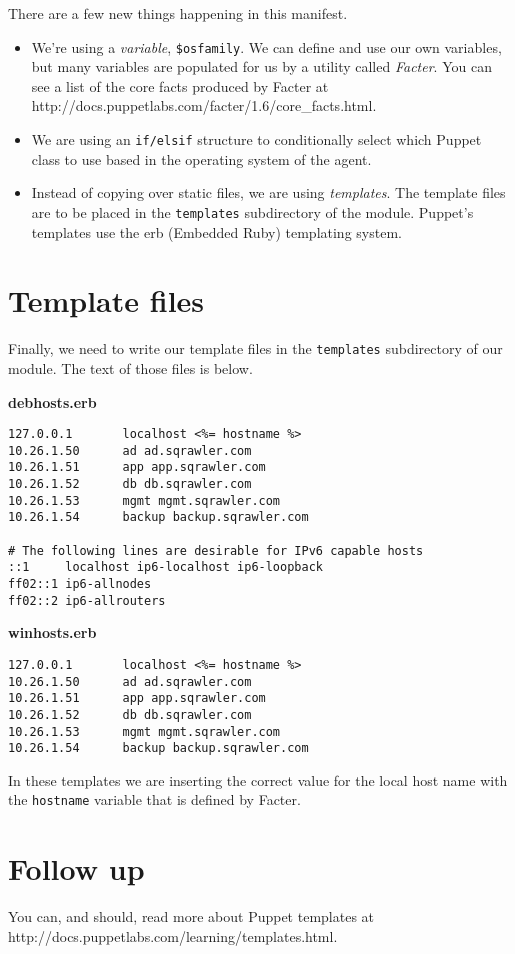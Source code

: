 \documentclass{article}   	%
\begin{document}
\newpage

There are a few new things happening in this manifest.
\begin{itemize}
  \item We're using a \emph{variable}, \texttt{\$osfamily}.  We can define and use our own variables, but many variables are populated for us by a utility called \emph{Facter}.  You can see a list of the core facts produced by Facter at \\ http://docs.puppetlabs.com/facter/1.6/core\_facts.html.
  \item We are using an \texttt{if/elsif} structure to conditionally select which Puppet class to use based in the operating system of the agent.
  \item Instead of copying over static files, we are using \emph{templates}.  The template files are to be placed in the \texttt{templates} subdirectory of the module.  Puppet's templates use the erb (Embedded Ruby) templating system.
\end{itemize}

\section{Template files}
Finally, we need to write our template files in the \texttt{templates} subdirectory of our module.  The text of those files is below.

\textbf{debhosts.erb}
\begin{verbatim}
127.0.0.1       localhost <%= hostname %>
10.26.1.50      ad ad.sqrawler.com
10.26.1.51      app app.sqrawler.com
10.26.1.52      db db.sqrawler.com
10.26.1.53      mgmt mgmt.sqrawler.com
10.26.1.54      backup backup.sqrawler.com

# The following lines are desirable for IPv6 capable hosts
::1     localhost ip6-localhost ip6-loopback
ff02::1 ip6-allnodes
ff02::2 ip6-allrouters
\end{verbatim}


\textbf{winhosts.erb}
\begin{verbatim}
127.0.0.1       localhost <%= hostname %>
10.26.1.50      ad ad.sqrawler.com
10.26.1.51      app app.sqrawler.com
10.26.1.52      db db.sqrawler.com
10.26.1.53      mgmt mgmt.sqrawler.com
10.26.1.54      backup backup.sqrawler.com

\end{verbatim}

In these templates we are inserting the correct value for the local host name with the \texttt{hostname} variable that is defined by Facter.

\section{Follow up}
You can, and should, read more about Puppet templates at http://docs.puppetlabs.com/learning/templates.html.
\end{document}
